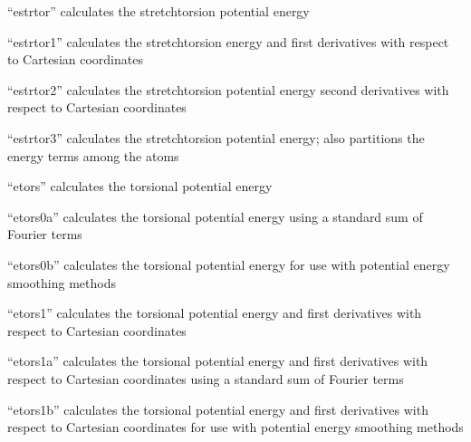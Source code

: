 \documentclass[letterpaper,11pt,english]{sphinxmanual}
\begin{document}
\sphinxAtStartPar
{}

\sphinxAtStartPar
“estrtor” calculates the stretch\sphinxhyphen{}torsion potential energy

\sphinxAtStartPar
{}

\sphinxAtStartPar
“estrtor1” calculates the stretch\sphinxhyphen{}torsion energy and first derivatives with respect to Cartesian coordinates

\sphinxAtStartPar
{}

\sphinxAtStartPar
“estrtor2” calculates the stretch\sphinxhyphen{}torsion potential energy second derivatives with respect to Cartesian coordinates

\sphinxAtStartPar
{}

\sphinxAtStartPar
“estrtor3” calculates the stretch\sphinxhyphen{}torsion potential energy; also partitions the energy terms among the atoms

\sphinxAtStartPar
{}

\sphinxAtStartPar
“etors” calculates the torsional potential energy

\sphinxAtStartPar
{}

\sphinxAtStartPar
“etors0a” calculates the torsional potential energy using a standard sum of Fourier terms

\sphinxAtStartPar
{}

\sphinxAtStartPar
“etors0b” calculates the torsional potential energy for use with potential energy smoothing methods

\sphinxAtStartPar
{}

\sphinxAtStartPar
“etors1” calculates the torsional potential energy and first derivatives with respect to Cartesian coordinates

\sphinxAtStartPar
{}

\sphinxAtStartPar
“etors1a” calculates the torsional potential energy and first derivatives with respect to Cartesian coordinates using a standard sum of Fourier terms

\sphinxAtStartPar
{}

\sphinxAtStartPar
“etors1b” calculates the torsional potential energy and first derivatives with respect to Cartesian coordinates for use with potential energy smoothing methods
\end{document}
